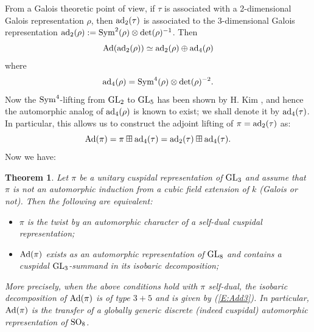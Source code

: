 \documentclass[11pt]{amsart}
\theoremstyle{plain}
\newtheorem{thm}[equation]{Theorem}
\numberwithin{equation}{section}
\def\GL{{\rm GL}}
\def\SO{{\rm SO}}
\begin{document}
\vskip 5pt

From a Galois theoretic point of view, if $\tau$ is associated with a 2-dimensional Galois representation $\rho$, then ${\rm ad}_2(\tau)$ is associated to the 3-dimensional Galois representation ${\rm ad}_2(\rho) := {\rm Sym}^2(\rho) \otimes \det(\rho)^{-1}$.  Then
\[ {\rm Ad}({\rm ad}_2(\rho) )  \simeq  {\rm ad}_2(\rho) \oplus {\rm ad}_4(\rho) \]
where
\[ {\rm ad}_4(\rho) = {\rm Sym}^4(\rho) \otimes \det(\rho)^{-2}. \]
Now the ${\rm Sym}^4$-lifting from $\GL_2$ to $\GL_5$ has been shown by H. Kim \cite{Ki}, and hence the automorphic analog of  ${\rm ad}_4(\rho)$ is  known to exist; we shall denote it by ${\rm ad}_4(\tau)$. In particular, this allows us to construct the adjoint lifting of $\pi ={\rm ad}_2(\tau)$ as:
\begin{equation} \label{E:Add3}
 {\rm Ad}(\pi)= \pi \boxplus {\rm ad}_4(\tau) = {\rm ad}_2(\tau) \boxplus {\rm ad}_4(\tau). \end{equation}
Now we have:
\vskip 5pt
\begin{thm} \label{T:selfdual}
Let $\pi$ be a unitary cuspidal representation of $\GL_3$ and assume that $\pi$ is not an automorphic induction from a cubic field extension of $k$ (Galois or not). 
Then the following are equivalent:
\vskip 5pt

\begin{itemize}
\item[(i)]  $\pi$ is the twist by an automorphic character of a self-dual cuspidal representation;
\vskip 5pt

\item[(ii)]  ${\rm Ad}(\pi)$ exists as an automorphic representation of $\GL_8$ and contains a cuspidal $\GL_3$-summand in its isobaric decomposition;
\end{itemize}
More precisely, when the above conditions hold with $\pi$ self-dual, the isobaric decomposition of ${\rm Ad}(\pi)$ is of type $3 +5$ and is given by (\ref{E:Add3}). 
In particular,  ${\rm Ad}(\pi)$ is the transfer of a globally generic discrete (indeed cuspidal) automorphic  representation of $\SO_8$.
\end{thm}
\end{document}
